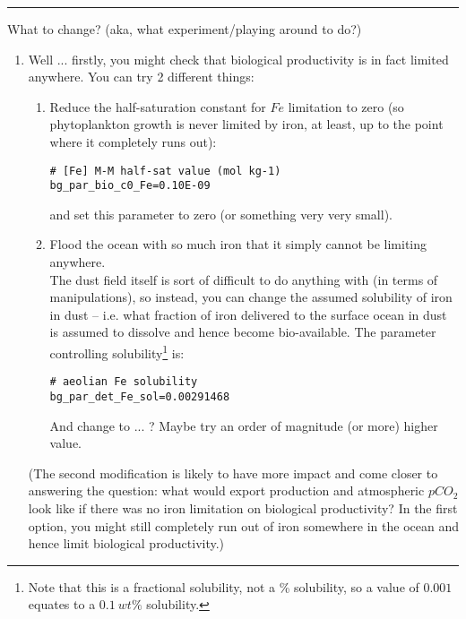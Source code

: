 \vspace{1mm} \noindent\rule{4cm}{0.1mm} \vspace{2mm}

\noindent What to change? (aka, what experiment/playing around to do?)

\begin{enumerate}[noitemsep]

\vspace{1mm}
\item Well ... firstly, you might check that biological productivity is in fact limited anywhere. You can try 2 different things:
\begin{enumerate}[noitemsep]
\vspace{1mm}
\item Reduce the half-saturation constant for \(Fe\) limitation to zero (so phytoplankton growth is never limited by iron, at least, up to the point where it completely runs out):
\vspace{-1mm}\small\begin{verbatim}
# [Fe] M-M half-sat value (mol kg-1)
bg_par_bio_c0_Fe=0.10E-09
\end{verbatim}\normalsize\vspace{-1mm}
and set this parameter to zero (or something very very small).
\vspace{1mm}
\item Flood the ocean with so much iron that it simply cannot be limiting anywhere.
\vspace{1mm}
\\The dust field itself is sort of difficult to do anything with (in terms of manipulations), so instead, you can change the assumed solubility of iron in dust -- i.e. what fraction of iron delivered to the surface ocean in dust is assumed to dissolve and hence become bio-available. The parameter controlling solubility\footnote{Note that this is a fractional solubility, not a \% solubility, so a value of \(0.001\) equates to a \(0.1\:wt\%\) solubility.} is:
\vspace{-1mm}\small\begin{verbatim}
# aeolian Fe solubility
bg_par_det_Fe_sol=0.00291468
\end{verbatim}\normalsize\vspace{-1mm}
And change to ... ? Maybe try an order of magnitude (or more) higher value.
\end{enumerate}
\vspace{1mm}
(The second modification is likely to have more impact and come closer to answering the question: what would export production and atmospheric \(pCO_{2}\) look like if there was no iron limitation on biological productivity? In the first option, you might still completely run out of iron somewhere in the ocean and hence limit biological productivity.)


\end{enumerate}
